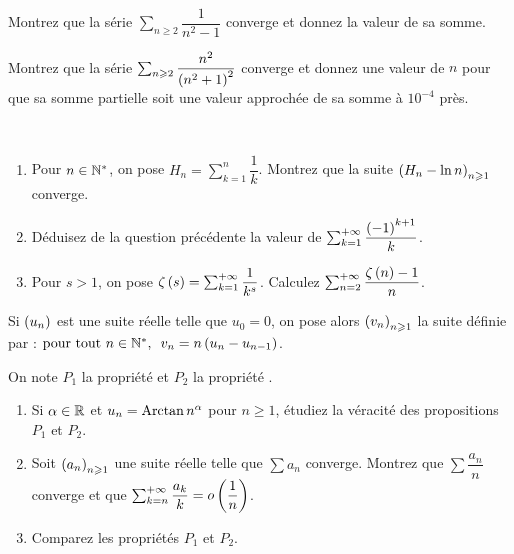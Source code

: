 \begin{exo}~\\
Montrez que la série \(\sum_{n\geq2}\dfrac{1}{n^2-1}\) converge et donnez la valeur de sa somme.

Montrez que la série \(\sum_{n\geqslant2}\dfrac{n^2}{\left(n^2+1\right)^2}\) converge et donnez une valeur de \(n\) pour que sa somme partielle soit une valeur approchée de sa somme à \(10^{-4}\) près.
\end{exo}



\begin{exo}~\\
\begin{enumerate}
    \item Pour \(n\in\mathbb{N}^*\), on pose \(H_n=\sum_{k=1}^n\dfrac{1}{k}\). Montrez que la suite \(\left(H_n-\ln n\right)_{n\geqslant1}\) converge. \\
    \item Déduisez de la question précédente la valeur de \(\sum_{k=1}^{+\infty}\dfrac{\left(-1\right)^{k+1}}{k}\). \\
    \item Pour \(s>1\), on pose \(\zeta\left(s\right)=\sum_{k=1}^{+\infty}\dfrac{1}{k^s}\). Calculez \(\sum_{n=2}^{+\infty}\dfrac{\zeta\left(n\right)-1}{n}\).
\end{enumerate}
\end{exo}



\begin{exo}
Si \(\left(u_n\right)\) est une suite réelle telle que \(u_0=0\), on pose alors \(\left(v_n\right)_{n\geqslant1}\) la suite définie par : \(\quantifs{\tpt n\in\Ns}v_n=n\paren{u_n-u_{n-1}}\).

On note \(P_1\) la propriété  et \(P_2\) la propriété .

\begin{enumerate}
    \item Si \(\alpha\in\mathbb{R}\) et \(u_n=\operatorname{Arctan} n^\alpha\) pour \(n\geq1\), étudiez la véracité des propositions \(P_1\) et \(P_2\). \\
    \item Soit \(\left(a_n\right)_{n\geqslant1}\) une suite réelle telle que \(\sum a_n\) converge. Montrez que \(\sum\dfrac{a_n}{n}\) converge et que \(\sum_{k=n}^{+\infty}\dfrac{a_k}{k}=o\left(\dfrac{1}{n}\right)\). \\
    \item Comparez les propriétés \(P_1\) et \(P_2\).
\end{enumerate}
\end{exo}



